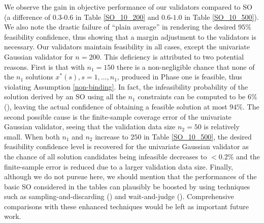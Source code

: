 \documentclass[mnsc,blindrev]{informs4} %
\begin{document}
We observe the gain in objective performance of our validators compared to SO (a difference of $0.3$-$0.6$ in Table \ref{SO_10_200} and $0.6$-$1.0$ in Table \ref{SO_10_500}). We also note the drastic failure of ``plain average'' in rendering the desired $95\%$ feasibility confidence, thus showing that a margin adjustment to the validators is necessary. Our validators maintain feasibility in all cases, except the univariate Gaussian validator for $n=200$. This deficiency is attributed to two potential reasons. First is that with $n_1=150$ there is a non-negligible chance that none of the $n_1$ solutions $x^*(s),s=1,\ldots,n_1$, produced in Phase one is feasible, thus violating Assumption \ref{non-binding}. In fact, the infeasibility probability of the solution derived by an SO using all the $n_1$ constraints can be computed to be $6\%$ (\cite{campi2008exact}), leaving the actual confidence of obtaining a feasible solution at most $94\%$. The second possible cause is the finite-sample coverage error of the univariate Gaussian validator, seeing that the validation data size $n_2=50$ is relatively small. When both $n_1$ and $n_2$ increase to $250$ in Table \ref{SO_10_500}, the desired feasibility confidence level is recovered for the univariate Gaussian validator as the chance of all solution candidates being infeasible decreases to $<0.2\%$ and the finite-sample error is reduced due to a larger validation data size. Finally, although we do not pursue here, we should mention that the performances of the basic SO considered in the tables can plausibly be boosted by using techniques such as sampling-and-discarding (\cite{campi2011sampling}) and wait-and-judge (\cite{campi2018wait}). Comprehensive comparisons with these enhanced techniques would be left as important future work.
\end{document}
